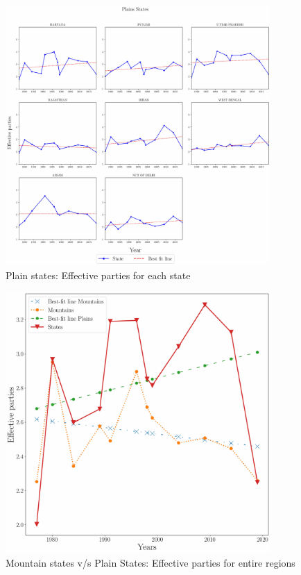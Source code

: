 \begin{figure}[htbp]
    \centering
    \includegraphics[width=0.9\textwidth]{figures/lok/plains_states.pdf}
    \caption{Plain states: Effective parties for each state}
    \label{img:plain_enp}
\end{figure}

\begin{figure}[htbp]
    \centering
    \includegraphics[width=0.9\textwidth]{figures/lok/final.pdf}
    \caption{Mountain states v/s Plain States: Effective parties for entire regions}
    \label{img:overall_enp}
\end{figure}

